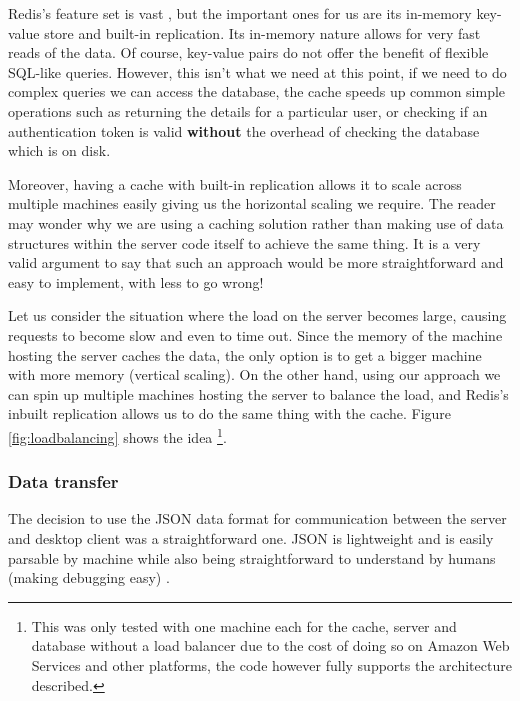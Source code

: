 Redis's feature set is vast \cite{redis}, but the important ones for us are its in-memory key-value store and built-in replication. Its in-memory nature allows for very fast reads of the data. Of course, key-value pairs do not offer the benefit of flexible SQL-like queries. However, this isn't what we need at this point, if we need to do complex queries we can access the database, the cache speeds up common simple operations such as returning the details for a particular user, or checking if an authentication token is valid \textbf{without} the overhead of checking the database which is on disk.

Moreover, having a cache with built-in replication allows it to scale across multiple machines easily giving us the horizontal scaling we require. The reader may wonder why we are using a caching solution rather than making use of data structures within the server code itself to achieve the same thing. It is a very valid argument to say that such an approach would be more straightforward and easy to implement, with less to go wrong!

Let us consider the situation where the load on the server becomes large, causing requests to become slow and even to time out. Since the memory of the machine hosting the server caches the data, the only option is to get a bigger machine with more memory (vertical scaling). On the other hand, using our approach we can spin up multiple machines hosting the server to balance the load, and Redis's inbuilt replication allows us to do the same thing with the cache. Figure \ref{fig:loadbalancing} shows the idea \footnote{This was only tested with one machine each for the cache, server and database without a load balancer due to the cost of doing so on Amazon Web Services and other platforms, the code however fully supports the architecture described.}.


\subsubsection{Data transfer}

The decision to use the JSON data format for communication between the server and desktop client was a straightforward one. JSON is lightweight and is easily parsable by machine while also being straightforward to understand by humans (making debugging easy) \cite{json}.

